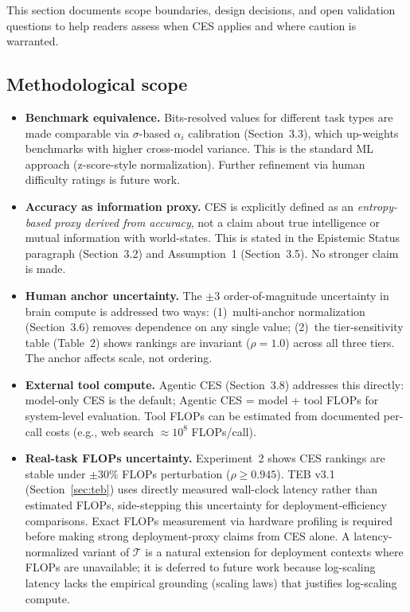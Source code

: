 \documentclass[12pt]{article}
\begin{document}
This section documents scope boundaries, design decisions, and open validation questions to help readers assess when CES applies and where caution is warranted.

\subsection*{Methodological scope}

\begin{itemize}

\item \textbf{Benchmark equivalence.} Bits-resolved values for different task types are made comparable via $\sigma$-based $\alpha_i$ calibration (Section~3.3), which up-weights benchmarks with higher cross-model variance. This is the standard ML approach (z-score-style normalization). Further refinement via human difficulty ratings is future work.

\item \textbf{Accuracy as information proxy.} CES is explicitly defined as an \textit{entropy-based proxy derived from accuracy}, not a claim about true intelligence or mutual information with world-states. This is stated in the Epistemic Status paragraph (Section~3.2) and Assumption~1 (Section~3.5). No stronger claim is made.

\item \textbf{Human anchor uncertainty.} The $\pm 3$ order-of-magnitude uncertainty in brain compute is addressed two ways: (1)~multi-anchor normalization (Section~3.6) removes dependence on any single value; (2)~the tier-sensitivity table (Table~2) shows rankings are invariant ($\rho = 1.0$) across all three tiers. The anchor affects scale, not ordering.

\item \textbf{External tool compute.} Agentic CES (Section~3.8) addresses this directly: model-only CES is the default; Agentic CES = model + tool FLOPs for system-level evaluation. Tool FLOPs can be estimated from documented per-call costs (e.g., web search $\approx 10^8$ FLOPs/call).

\item \textbf{Real-task FLOPs uncertainty.} Experiment~2 shows CES rankings are stable under $\pm 30\%$ FLOPs perturbation ($\rho \geq 0.945$). TEB v3.1 (Section~\ref{sec:teb}) uses directly measured wall-clock latency rather than estimated FLOPs, side-stepping this uncertainty for deployment-efficiency comparisons. Exact FLOPs measurement via hardware profiling is required before making strong deployment-proxy claims from CES alone. A latency-normalized variant of $\mathcal{T}$ is a natural extension for deployment contexts where FLOPs are unavailable; it is deferred to future work because log-scaling latency lacks the empirical grounding (scaling laws) that justifies log-scaling compute.


\end{itemize}
\end{document}
